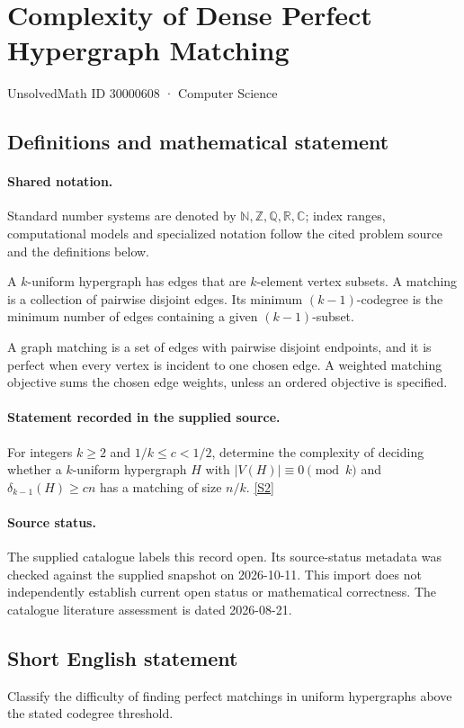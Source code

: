 \documentclass[11pt]{article}
\newcommand{\sref}[2]{\hyperlink{source:#1:#2}{[S#2]}}
\begin{document}
\setcounter{section}{30000607}
\section{Complexity of Dense Perfect Hypergraph Matching}\label{30000608}
{\small\sffamily UnsolvedMath ID 30000608 · Computer Science}
\subsection{Definitions and mathematical statement}

\paragraph{Shared notation.}Standard number systems are denoted by $\mathbb N,\mathbb Z,\mathbb Q,\mathbb R,\mathbb C$; index ranges, computational models and specialized notation follow the cited problem source and the definitions below.


A $k$-uniform hypergraph has edges that are $k$-element vertex subsets. A matching is a collection of pairwise disjoint edges. Its minimum $(k-1)$-codegree is the minimum number of edges containing a given $(k-1)$-subset.

A graph matching is a set of edges with pairwise disjoint endpoints, and it is perfect when every vertex is incident to one chosen edge. A weighted matching objective sums the chosen edge weights, unless an ordered objective is specified.
\paragraph{Statement recorded in the supplied source.}
For integers $k\geq2$ and $1/k\leq c<1/2$, determine the complexity of deciding whether a $k$-uniform hypergraph $H$ with $|V(H)|\equiv0\pmod k$ and $\delta_{k-1}(H)\geq cn$ has a matching of size $n/k$. \sref{30000608}{2}
\paragraph{Source status.}
The supplied catalogue labels this record open. Its source-status metadata was checked against the supplied snapshot on 2026-10-11. This import does not independently establish current open status or mathematical correctness. The catalogue literature assessment is dated 2026-08-21.
\subsection{Short English statement}
Classify the difficulty of finding perfect matchings in uniform hypergraphs above the stated codegree threshold.
\end{document}
